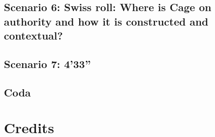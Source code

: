 \documentclass[17pt]{extarticle}
\begin{document}
\newpage

\subsection{Scenario 6: Swiss roll: Where is Cage on authority and how it is constructed and contextual?}

\newpage

\subsection{Scenario 7: 4'33''}

\newpage

\subsection{Coda}

\newpage

\section{Credits}
\end{document}
